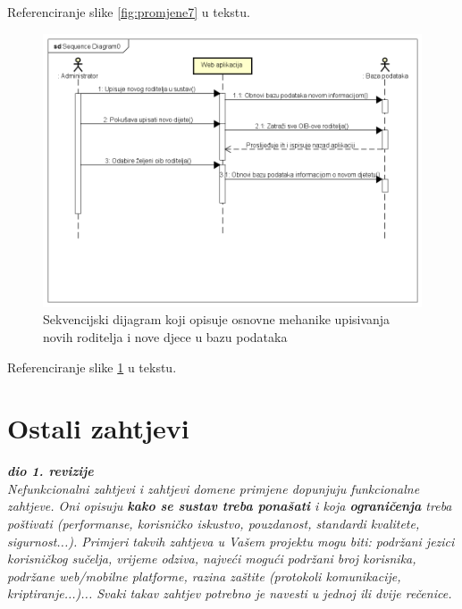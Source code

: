 				Referenciranje slike \ref{fig:promjene7} u tekstu.
				\begin{figure}[H]
					\includegraphics[width=\textwidth]{slike/SDadminapp.PNG} %
					\caption{Sekvencijski dijagram koji opisuje osnovne mehanike upisivanja novih roditelja i nove djece u bazu podataka}
					\label{fig:promjene8} %
				\end{figure}
				
				Referenciranje slike \ref{fig:promjene8} u tekstu.
	
		\section{Ostali zahtjevi}
		
			\textbf{\textit{dio 1. revizije}}\\
		 
			 \textit{Nefunkcionalni zahtjevi i zahtjevi domene primjene dopunjuju funkcionalne zahtjeve. Oni opisuju \textbf{kako se sustav treba ponašati} i koja \textbf{ograničenja} treba poštivati (performanse, korisničko iskustvo, pouzdanost, standardi kvalitete, sigurnost...). Primjeri takvih zahtjeva u Vašem projektu mogu biti: podržani jezici korisničkog sučelja, vrijeme odziva, najveći mogući podržani broj korisnika, podržane web/mobilne platforme, razina zaštite (protokoli komunikacije, kriptiranje...)... Svaki takav zahtjev potrebno je navesti u jednoj ili dvije rečenice.}
			 
			 
			 
	